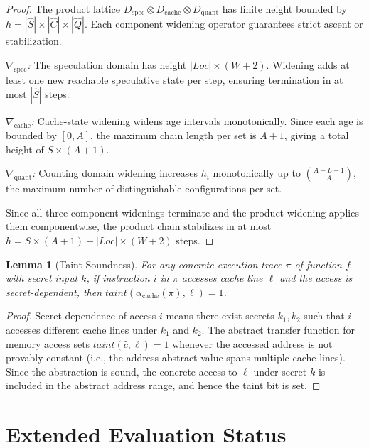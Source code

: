 \documentclass{article}
\newtheorem{lemma}[theorem]{Lemma}
\theoremstyle{definition}
\theoremstyle{remark}
\newcommand{\Dspec}{D_{\text{spec}}}
\newcommand{\Dcache}{D_{\text{cache}}}
\newcommand{\Dquant}{D_{\text{quant}}}
\begin{document}
\begin{proof}
The product lattice $\Dspec \otimes \Dcache \otimes \Dquant$ has finite
height bounded by $h = |\hat{S}| \times |\hat{C}| \times |\hat{Q}|$.
Each component widening operator guarantees strict ascent or stabilization.

\emph{$\nabla_{\text{spec}}$:}
The speculation domain has height $|\mathit{Loc}| \times (W + 2)$. Widening adds
at least one new reachable speculative state per step, ensuring termination
in at most $|\hat{S}|$ steps.

\emph{$\nabla_{\text{cache}}$:}
Cache-state widening widens age intervals monotonically. Since each age is
bounded by $[0, A]$, the maximum chain length per set is $A + 1$, giving
a total height of $S \times (A + 1)$.

\emph{$\nabla_{\text{quant}}$:}
Counting domain widening increases $h_i$ monotonically up to $\binom{A + L - 1}{A}$,
the maximum number of distinguishable configurations per set.

Since all three component widenings terminate and the product widening
applies them componentwise, the product chain stabilizes in at most
$h = S \times (A + 1) + |\mathit{Loc}| \times (W + 2)$ steps.
\end{proof}

\begin{lemma}[Taint Soundness]
\label{lem:taint-sound-app}
For any concrete execution trace $\pi$ of function $f$ with secret input $k$,
if instruction $i$ in $\pi$ accesses cache line $\ell$ and the access is
secret-dependent, then $\mathit{taint}(\alpha_{\text{cache}}(\pi), \ell) = 1$.
\end{lemma}

\begin{proof}
Secret-dependence of access $i$ means there exist secrets $k_1, k_2$ such that
$i$ accesses different cache lines under $k_1$ and $k_2$.  The abstract transfer
function for memory access sets $\mathit{taint}(\hat{c}, \ell) = 1$ whenever
the accessed address is not provably constant (i.e., the address abstract
value spans multiple cache lines).  Since the abstraction is sound, the
concrete access to $\ell$ under secret $k$ is included in the abstract
address range, and hence the taint bit is set.
\end{proof}

\section{Extended Evaluation Status}
\label{app:extended}
\end{document}

